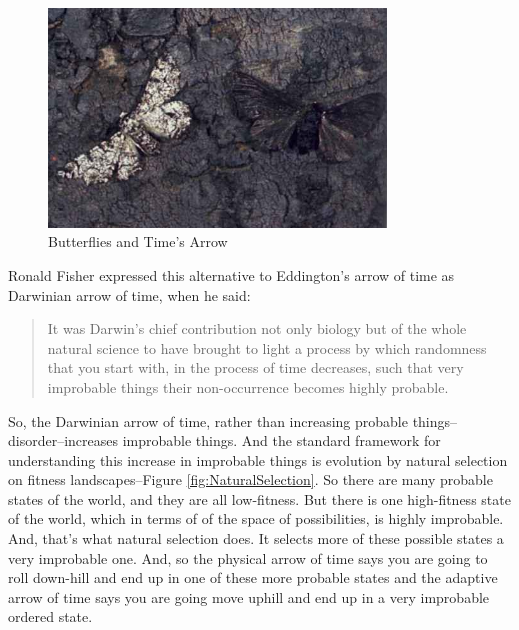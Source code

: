 \documentclass[]{article}
\begin{document}
\begin{figure}[H]
	\begin{center}
		\caption{Butterflies and Time's Arrow}\label{fig:butterflies}
		\includegraphics[width=0.8\textwidth]{butterflies}
	\end{center}
\end{figure}

Ronald Fisher expressed this alternative to Eddington's arrow of time as Darwinian arrow
of time, when he said: 
\begin{quotation}
	It was Darwin's chief contribution not only biology but of the whole natural science to have brought to light a process by which randomness that you start with, in the process of time decreases, such that very improbable things their non-occurrence becomes highly probable\cite{huxley1954evolution}.
\end{quotation}

So, the Darwinian arrow of time, rather than increasing probable things--disorder--increases improbable things.
And the standard framework for understanding this increase in improbable things is evolution by natural selection on fitness landscapes--Figure \ref{fig:NaturalSelection}. So there are many probable states of the world, and they are all low-fitness. But there is one high-fitness state of the world, which in terms of of the space of possibilities, is highly improbable.
And, that's what natural selection does. It selects more of these possible states
a very improbable one. And, so the physical arrow of time says you are going to roll down-hill and end up in one of these more probable states and the adaptive arrow of time says you are going move uphill and end up in a very improbable ordered state.
\end{document}

